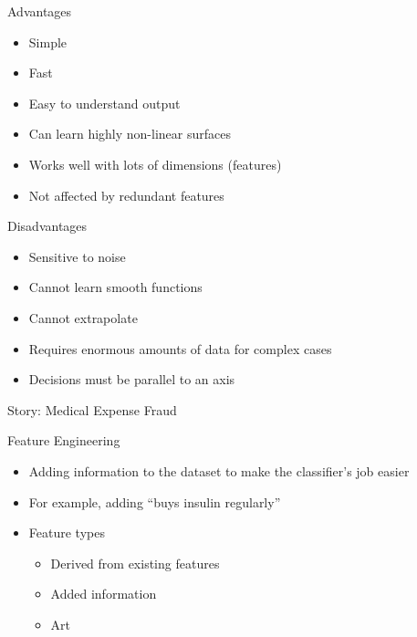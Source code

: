 \documentclass{beamer}
\begin{document}
\begin{frame}{Advantages}
  \begin{itemize}
  \item Simple
  \item Fast
  \item Easy to understand output
  \item Can learn highly non-linear surfaces
  \item Works well with lots of dimensions (features)
  \item Not affected by redundant features
  \end{itemize}
\end{frame}

\begin{frame}{Disadvantages}
  \begin{itemize}
  \item Sensitive to noise
  \item Cannot learn smooth functions
  \item Cannot extrapolate
  \item Requires enormous amounts of data for complex cases
  \item Decisions must be parallel to an axis
  \end{itemize}
\end{frame}


\begin{frame}{Story: Medical Expense Fraud}

  \begin{center}
  \end{center}
  
\end{frame}

\begin{frame}{Feature Engineering}
  \begin{itemize}
  \item Adding information to the dataset to make the classifier's job easier
  \item For example, adding ``buys insulin regularly''
  \item Feature types
    \begin{itemize}
      \item Derived from existing features
      \item Added information
      \item Art
    \end{itemize}
  \end{itemize}
\end{frame}
\end{document}
